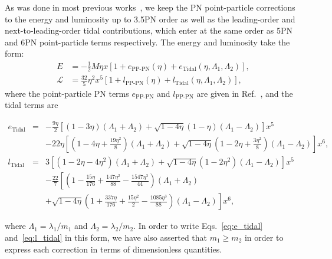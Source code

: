 \documentclass[twocolumn,prd,amssymb,aps,nofootinbib,showpacs,epsf]{revtex4}
\begin{document}
As was done in most previous works~\cite{WadeCreightonOchsner2014, DelPozzoLiAgathos2013, Favata2014, YagiYunes2014}, we keep the PN point-particle corrections to the energy and luminosity up to 3.5PN order as well as the leading-order and next-to-leading-order tidal contributions, which enter at the same order as 5PN and 6PN point-particle terms respectively.  The energy and luminosity take the form:
\begin{align}
E &= - \frac{1}{2} M \eta x \left[1 + e_\text{PP-PN}(\eta) + e_\text{Tidal}(\eta, \Lambda_1, \Lambda_2)\right], \\
\mathcal{L} &= \frac{32}{5}\eta^2 x^5 \left[ 1 + l_\text{PP-PN}(\eta) + l_\text{Tidal}(\eta, \Lambda_1, \Lambda_2)\right],
\end{align}
where the point-particle PN terms $e_\text{PP-PN}$ and $l_\text{PP-PN}$ are given in Ref.~\cite{Blanchet2014Review}, and the tidal terms are
\begin{widetext}
\begin{eqnarray}
\label{eq:e_tidal}
e_\text{Tidal} &=& -\frac{9\eta}{2} \left[ (1-3\eta)(\Lambda_1+\Lambda_2) + \sqrt{1-4\eta}(1-\eta)(\Lambda_1-\Lambda_2) \right]x^5 \\
\nonumber
&& - 22\eta \left[ \left(1-4\eta+\frac{19\eta^2}{8}\right)(\Lambda_1+\Lambda_2) + \sqrt{1-4\eta}\left(1-2\eta+\frac{3\eta^2}{8}\right)(\Lambda_1-\Lambda_2) \right]x^6,\\
\label{eq:l_tidal}
l_\text{Tidal}&=&3 \left[ (1-2\eta-4\eta^2)(\Lambda_1+\Lambda_2) + \sqrt{1-4\eta}(1-2\eta^2)(\Lambda_1-\Lambda_2) \right]x^5 \\
\nonumber
&& - \frac{22}{7} \left[ \left(1-\frac{15\eta}{176}+\frac{147\eta^2}{88}-\frac{1547\eta^3}{44}\right)(\Lambda_1+\Lambda_2) \right . \\
\nonumber
&& \left . + \sqrt{1-4\eta}\left(1+\frac{337\eta}{176}+\frac{15\eta^2}{2}-\frac{1085\eta^3}{88}\right)(\Lambda_1-\Lambda_2) \right]x^6,
\end{eqnarray}
\end{widetext}
where $\Lambda_1=\lambda_1/m_1$ and $\Lambda_2=\lambda_2/m_2$.  In order to write Eqs.~\eqref{eq:e_tidal} and~\eqref{eq:l_tidal} in this form, we have also asserted that $m_1 \ge m_2$ in order to express each correction in terms of dimensionless quantities.
\end{document}
